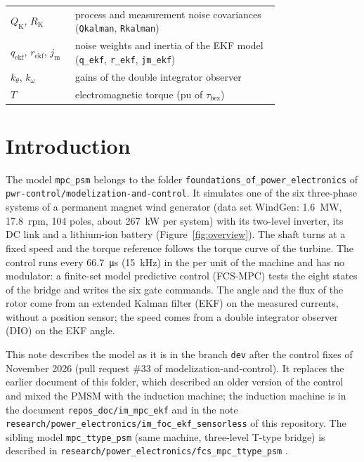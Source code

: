\documentclass[11pt,a4paper]{scrartcl}
\newcommand{\ped}[1]{_{\mathrm{#1}}}
\newcommand{\code}[1]{\texttt{#1}}
\begin{document}
\begin{onehalfspace}
\begin{longtable}{@{} l p{0.76\linewidth} @{}}
	$Q\ped{K}$, $R\ped{K}$ & process and measurement noise covariances (\code{Qkalman}, \code{Rkalman}) \\
	$q\ped{ekf}$, $r\ped{ekf}$, $j\ped{m}$ & noise weights and inertia of the EKF model (\code{q\_ekf}, \code{r\_ekf}, \code{jm\_ekf}) \\
	$k_\theta$, $k_\omega$ & gains of the double integrator observer \\
	$T$ & electromagnetic torque (pu of $\tau\ped{bez}$) \\
\end{longtable}
\endgroup
\addtocounter{table}{-1}

\section{Introduction}
\label{sec:intro}

The model \code{mpc\_psm} \cite{mc_repo} belongs to the folder \code{foundations\_of\_power\_electronics} of \code{pwr-control/modelization-and-control}. It simulates one of the six three-phase systems of a permanent magnet wind generator (data set WindGen: \SI{1.6}{\mega\watt}, \SI{17.8}{rpm}, 104 poles, about \SI{267}{\kilo\watt} per system) with its two-level inverter, its DC link and a lithium-ion battery (Figure~\ref{fig:overview}). The shaft turns at a fixed speed and the torque reference follows the torque curve of the turbine. The control runs every \SI{66.7}{\micro\second} (\SI{15}{\kilo\hertz}) in the per unit of the machine and has no modulator: a finite-set model predictive control (FCS-MPC) \cite{kouro2009,rodriguez2012} tests the eight states of the bridge and writes the six gate commands. The angle and the flux of the rotor come from an extended Kalman filter (EKF) on the measured currents, without a position sensor; the speed comes from a double integrator observer (DIO) on the EKF angle.

This note describes the model as it is in the branch \code{dev} after the control fixes of November 2026 (pull request \#33 of modelization-and-control). It replaces the earlier document of this folder, which described an older version of the control and mixed the PMSM with the induction machine; the induction machine is in the document \code{repos\_doc/im\_mpc\_ekf} and in the note \code{research/power\_electronics/im\_foc\_ekf\_sensorless} of this repository. The sibling model \code{mpc\_ttype\_psm} (same machine, three-level T-type bridge) is described in \code{research/power\_electronics/fcs\_mpc\_ttype\_psm} \cite{ttype_note}.


\end{onehalfspace}
\end{document}
